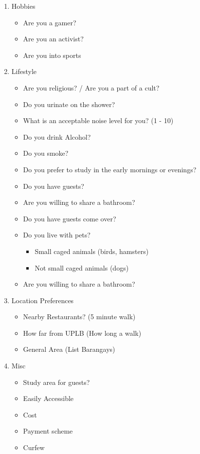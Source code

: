 \documentclass[journal]{./IEEE/IEEEtran}
\begin{document}
\begin{enumerate}
    \item Hobbies
    \begin{itemize}
        \item Are you a gamer?
        \item Are you an activist?
        \item Are you into sports
    \end{itemize}

    \item Lifestyle
    \begin{itemize}
        \item Are you religious? / Are you a part of a cult?
        \item Do you urinate on the shower?
        \item What is an acceptable noise level for you? (1 - 10)
        \item Do you drink Alcohol?
        \item Do you smoke?
        \item Do you prefer to study in the early mornings or evenings?
        \item Do you have guests?
        \item Are you willing to share a bathroom?
        \item Do you have guests come over?
        \item Do you live with pets?
        \begin{itemize}
            \item Small caged animals (birds, hamsters)
            \item Not small caged animals (dogs)
        \end{itemize}
        \item Are you willing to share a bathroom?
    \end{itemize}

    \item Location Preferences
    \begin{itemize}
        \item Nearby Restaurants? (5 minute walk)
        \item How far from UPLB (How long a walk)
        \item General Area (List Barangays)
    \end{itemize}

    \item Misc
    \begin{itemize}
        \item Study area for guests?
        \item Easily Accessible
        \item Cost
        \item Payment scheme
        \item Curfew
    \end{itemize}
\end{enumerate}
\end{document}

